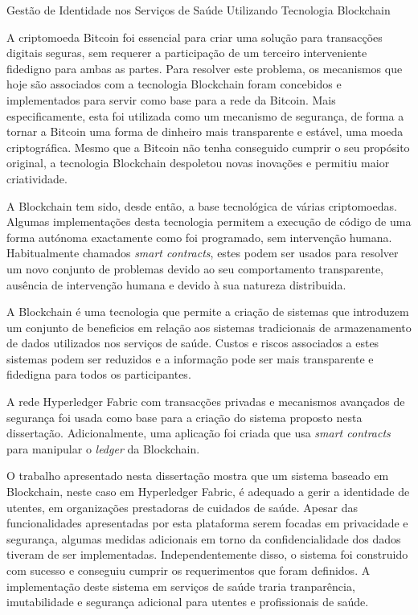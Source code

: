 \begin{tueSUMARIO}
  {\Large Gestão de Identidade nos Serviços de Saúde Utilizando Tecnologia
  Blockchain}
	\bigskip

  A criptomoeda Bitcoin foi essencial para criar uma solução para transacções
  digitais seguras, sem requerer a participação de um terceiro interveniente
  fidedigno para ambas as partes.  Para resolver este problema, os mecanismos
  que hoje são associados com a tecnologia Blockchain foram concebidos e
  implementados para servir como base para a rede da Bitcoin. Mais
  especificamente, esta foi utilizada como um mecanismo de segurança, de forma
  a tornar a Bitcoin uma forma de dinheiro mais transparente e estável, uma
  moeda criptográfica. Mesmo que a Bitcoin não tenha conseguido cumprir o seu
  propósito original, a tecnologia Blockchain despoletou novas inovações e
  permitiu maior criatividade.

  A Blockchain tem sido, desde então, a base tecnológica de várias
  criptomoedas. Algumas implementações desta tecnologia permitem a execução de
  código de uma forma autónoma exactamente como foi programado, sem intervenção
  humana.  Habitualmente chamados \textit{smart contracts}, estes podem ser
  usados para resolver um novo conjunto de problemas devido ao seu
  comportamento transparente, ausência de intervenção humana e devido à sua
  natureza distribuida. 

  A Blockchain é uma tecnologia que permite a criação de sistemas que
  introduzem um conjunto de beneficios em relação aos sistemas tradicionais de
  armazenamento de dados utilizados nos serviços de saúde. Custos e riscos
  associados a estes sistemas podem ser reduzidos e a informação pode ser mais
  transparente e fidedigna para todos os participantes.

  A rede Hyperledger Fabric com transacções privadas e mecanismos avançados de
  segurança foi usada como base para a criação do sistema proposto nesta
  dissertação. Adicionalmente, uma aplicação foi criada que usa \textit{smart
  contracts} para manipular o \textit{ledger} da Blockchain.

  O trabalho apresentado nesta dissertação mostra que um sistema baseado em
  Blockchain, neste caso em Hyperledger Fabric, é adequado a gerir a identidade
  de utentes,  em organizações prestadoras de cuidados de saúde. Apesar das
  funcionalidades apresentadas por esta plataforma serem focadas em privacidade
  e segurança, algumas medidas adicionais em torno da confidencialidade dos
  dados tiveram de ser implementadas. Independentemente disso, o sistema foi
  construido com sucesso e conseguiu cumprir os requerimentos que foram
  definidos. A implementação deste sistema em serviços de saúde traria
  tranparência, imutabilidade e segurança adicional para utentes e
  profissionais de saúde.

\end{tueSUMARIO}
